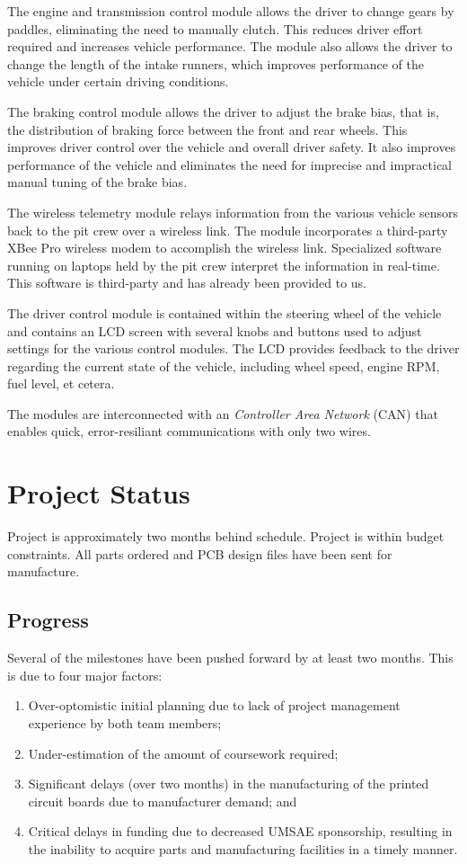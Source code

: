 \documentclass[12pt]{report}
\begin{document}
The engine and transmission control module allows the driver to change gears by paddles, eliminating the need to manually clutch. This reduces driver effort required and increases vehicle performance. The module also allows the driver to change the length of the intake runners, which improves performance of the vehicle under certain driving conditions.

The braking control module allows the driver to adjust the brake bias, that is, the distribution of braking force between the front and rear wheels. This improves driver control over the vehicle and overall driver safety. It also improves performance of the vehicle and eliminates the need for imprecise and impractical manual tuning of the brake bias.

The wireless telemetry module relays information from the various vehicle sensors back to the pit crew over a wireless link. The module incorporates a third-party XBee Pro wireless modem to accomplish the wireless link. Specialized software running on laptops held by the pit crew interpret the information in real-time. This software is third-party and has already been provided to us.

The driver control module is contained within the steering wheel of the vehicle and contains an LCD screen with several knobs and buttons used to adjust settings for the various control modules. The LCD provides feedback to the driver regarding the current state of the vehicle, including wheel speed, engine RPM, fuel level, et cetera. 

The modules are interconnected with an \emph{Controller Area Network} (CAN) that enables quick, error-resiliant communications with only two wires.

\pagebreak

\section{Project Status}

Project is approximately two months behind schedule. Project is within budget constraints. All parts ordered and PCB design files have been sent for manufacture. 

\subsection{Progress}

Several of the milestones have been pushed forward by at least two months. This is due to four major factors:
\begin{enumerate}
\item Over-optomistic initial planning due to lack of project management experience by both team members;
\item Under-estimation of the amount of coursework required; 
\item Significant delays (over two months) in the manufacturing of the printed circuit boards due to manufacturer demand; and
\item Critical delays in funding due to decreased UMSAE sponsorship, resulting in the inability to acquire parts and manufacturing facilities in a timely manner.
\end{enumerate}
\end{document}
